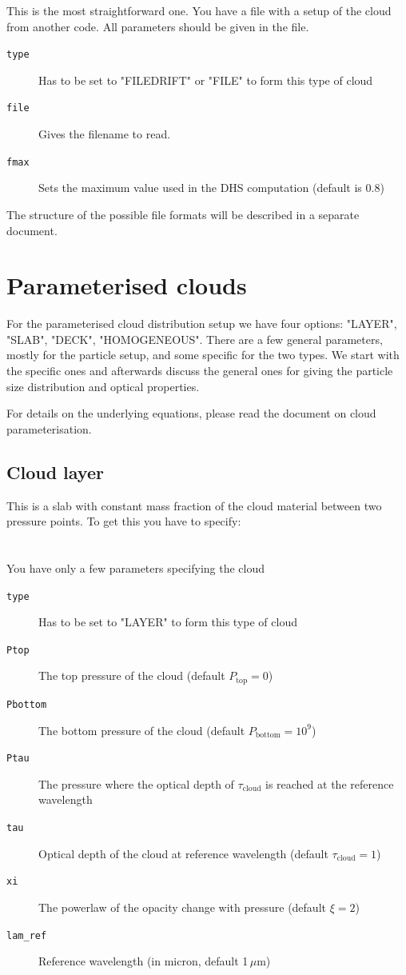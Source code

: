 \documentclass[12pt]{article}
\begin{document}
This is the most straightforward one. You have a file with a setup of the cloud from another code. All parameters should be given in the file.

\begin{description}
\item[\texttt{type}]
Has to be set to "FILEDRIFT" or "FILE" to form this type of cloud
\item[\texttt{file}]
Gives the filename to read.
\item[\texttt{fmax}]
Sets the maximum value used in the DHS computation (default is 0.8)
\end{description}
The structure of the possible file formats will be described in a separate document.

\section{Parameterised clouds}

For the parameterised cloud distribution setup we have four options: "LAYER", "SLAB", "DECK", "HOMOGENEOUS".
There are a few general parameters, mostly for the particle setup, and some specific for the two types. We start with the specific ones and afterwards discuss the general ones for giving the particle size distribution and optical properties.

For details on the underlying equations, please read the document on cloud parameterisation.

\subsection{Cloud layer}

This is a slab with constant mass fraction of the cloud material between two pressure points. To get this you have to specify:
\\
\\
\\
You have only a few parameters specifying the cloud

\begin{description}
\item[\texttt{type}]
Has to be set to "LAYER" to form this type of cloud
\item[\texttt{Ptop}]
The top pressure of the cloud (default $P_\mathrm{top}=0$)
\item[\texttt{Pbottom}]
The bottom pressure of the cloud (default $P_\mathrm{bottom}=10^9$)
\item[\texttt{Ptau}]
The pressure where the optical depth of $\tau_\mathrm{cloud}$ is reached at the reference wavelength
\item[\texttt{tau}]
Optical depth of the cloud at reference wavelength (default $\tau_\mathrm{cloud}=1$)
\item[\texttt{xi}]
The powerlaw of the opacity change with pressure (default $\xi=2$)
\item[\texttt{lam\_ref}]
Reference wavelength (in micron, default 1\,$\mu$m)
\end{description}
\end{document}
